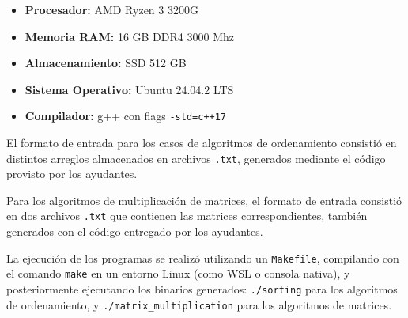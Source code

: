 \begin{itemize}
    \item \textbf{Procesador:} AMD Ryzen 3 3200G
    \item \textbf{Memoria RAM:} 16 GB DDR4 3000 Mhz
    \item \textbf{Almacenamiento:} SSD 512 GB
    \item \textbf{Sistema Operativo:} Ubuntu 24.04.2 LTS
    \item \textbf{Compilador:} g++ con flags \texttt{-std=c++17 }
\end{itemize}
El formato de entrada para los casos de algoritmos de ordenamiento consistió en distintos arreglos almacenados en archivos \texttt{.txt}, generados mediante el código provisto por los ayudantes.

\vspace{0.5em}

Para los algoritmos de multiplicación de matrices, el formato de entrada consistió en dos archivos \texttt{.txt} que contienen las matrices correspondientes, también generados con el código entregado por los ayudantes.

\vspace{0.5em}

La ejecución de los programas se realizó utilizando un \texttt{Makefile}, compilando con el comando \texttt{make} en un entorno Linux (como WSL o consola nativa), y posteriormente ejecutando los binarios generados: \texttt{./sorting} para los algoritmos de ordenamiento, y \texttt{./matrix\_multiplication} para los algoritmos de matrices.
